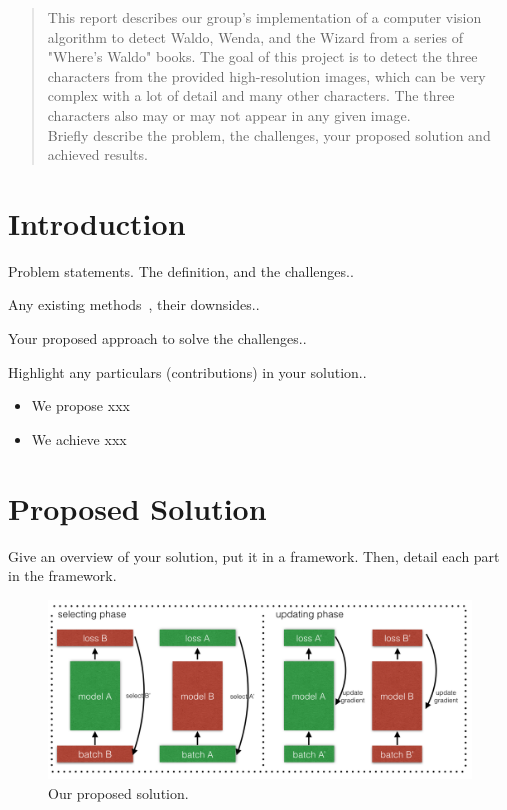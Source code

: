 \documentclass[11pt]{article}
\begin{document}
	

\begin{abstract}
This report describes our group's implementation of a computer vision algorithm to detect Waldo, Wenda, and the Wizard from a series of "Where's Waldo" books. The goal of this project is to detect the three characters from the provided high-resolution images, which can be very complex with a lot of detail and many other characters. The three characters also may or may not appear in any given image.\\

Briefly describe the problem, the challenges, your proposed solution and achieved results. 
\end{abstract}
\section{Introduction}
Problem statements. The definition, and the challenges.. 

Any existing methods~\cite{deng2009imagenet}, their downsides.. 

Your proposed approach to solve the challenges..

Highlight any particulars (contributions) in your solution..
\begin{itemize}
    \item We propose xxx
    \item We achieve xxx
\end{itemize}

\section{Proposed Solution}
Give an overview of your solution, put it in a framework. Then, detail each part in the framework.

\begin{figure}[ht]
\centering
    \includegraphics[width=14cm]{figures/coteaching.png}
    \caption{Our proposed solution.}
    \label{fig:framework}
\end{figure}
\end{document}
